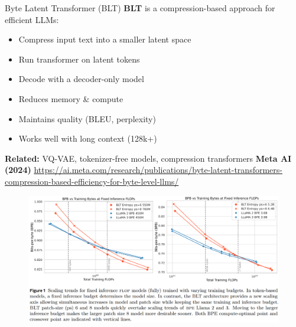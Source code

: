 \begin{frame}[allowframebreaks]{Byte Latent Transformer (BLT)}
\framebreak
    \textbf{BLT} is a compression-based approach for efficient LLMs:
    \begin{itemize}
        \item Compress input text into a smaller latent space
        \item Run transformer on latent tokens
        \item Decode with a decoder-only model
    \end{itemize}
    \vspace{1em}
    \begin{itemize}
        \item[\checkmark] Reduces memory \& compute
        \item[\checkmark] Maintains quality (BLEU, perplexity)
        \item[\checkmark] Works well with long context (128k+)
    \end{itemize}
    \vspace{1em}
    \textbf{Related:} VQ-VAE, tokenizer-free models, compression transformers
    \vspace{1em}
    \footnotesize{\textbf{Meta AI (2024)} \url{https://ai.meta.com/research/publications/byte-latent-transformers-compression-based-efficiency-for-byte-level-llms/}}
\framebreak
    \begin{figure}
        \centering
        \includegraphics[height=0.9\textheight,width=1.05\textwidth,keepaspectratio]{images/recent-advance/blt-flops.png}
    \end{figure}
\framebreak
    \begin{figure}
        \centering

\end{figure}
\end{frame}
